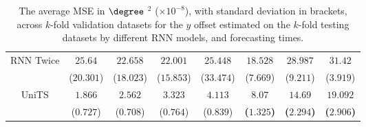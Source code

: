 \begin{table}[!ht]
{\begin{tabular}{|c|c|c|c|c|c|c|c|}
			\multirow{2}{*}{RNN Twice} & $25.64$ & $22.658$ & $22.001$ & $25.448$ & $18.528$ & $28.987$ & $31.42$ \\
			 & ($20.301$) & ($18.023$) & ($15.853$) & ($33.474$) & ($7.669$) & ($9.211$) & ($3.919$) \\ \hline
			\multirow{2}{*}{UniTS} & $1.866$ & $2.562$ & $3.323$ & $4.113$ & $\mathbf{8.07}$ & $\mathbf{14.69}$ & $\mathbf{19.092}$ \\
			 & ($0.727$) & ($0.708$) & ($0.764$) & ($0.839$) & \textbf{(}$\mathbf{1.325}$\textbf{)} & \textbf{(}$\mathbf{2.294}$\textbf{)} & \textbf{(}$\mathbf{2.906}$\textbf{)} \\ \hline
		\end{tabular}
	}
	\caption{The average MSE in $\degree$ $^{2}$ ($\times 10^{-8}$), with standard deviation in brackets, across $k$-fold validation datasets for the $y$ offset estimated on the $k$-fold testing datasets by different RNN models, and forecasting times.}
	\label{tab:all_latitude_no_abs_MSE}
\end{table}

